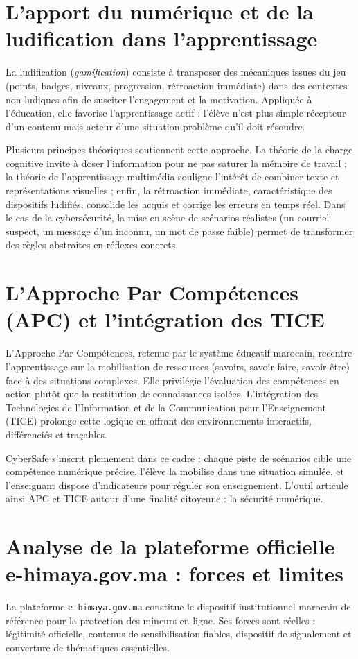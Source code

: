 \documentclass[12pt, a4paper, oneside]{report}
\begin{document}
\section{L'apport du numérique et de la ludification dans l'apprentissage}
La ludification (\textit{gamification}) consiste à transposer des mécaniques issues du jeu (points, badges, niveaux, progression, rétroaction immédiate) dans des contextes non ludiques afin de susciter l'engagement et la motivation. Appliquée à l'éducation, elle favorise l'apprentissage actif : l'élève n'est plus simple récepteur d'un contenu mais acteur d'une situation-problème qu'il doit résoudre.

Plusieurs principes théoriques soutiennent cette approche. La théorie de la charge cognitive invite à doser l'information pour ne pas saturer la mémoire de travail ; la théorie de l'apprentissage multimédia souligne l'intérêt de combiner texte et représentations visuelles ; enfin, la rétroaction immédiate, caractéristique des dispositifs ludifiés, consolide les acquis et corrige les erreurs en temps réel. Dans le cas de la cybersécurité, la mise en scène de scénarios réalistes (un courriel suspect, un message d'un inconnu, un mot de passe faible) permet de transformer des règles abstraites en réflexes concrets.

\section{L'Approche Par Compétences (APC) et l'intégration des TICE}
L'Approche Par Compétences, retenue par le système éducatif marocain, recentre l'apprentissage sur la mobilisation de ressources (savoirs, savoir-faire, savoir-être) face à des situations complexes. Elle privilégie l'évaluation des compétences en action plutôt que la restitution de connaissances isolées. L'intégration des Technologies de l'Information et de la Communication pour l'Enseignement (TICE) prolonge cette logique en offrant des environnements interactifs, différenciés et traçables.

CyberSafe s'inscrit pleinement dans ce cadre : chaque piste de scénarios cible une compétence numérique précise, l'élève la mobilise dans une situation simulée, et l'enseignant dispose d'indicateurs pour réguler son enseignement. L'outil articule ainsi APC et TICE autour d'une finalité citoyenne : la sécurité numérique.

\section{Analyse de la plateforme officielle e-himaya.gov.ma : forces et limites}
La plateforme \texttt{e-himaya.gov.ma} constitue le dispositif institutionnel marocain de référence pour la protection des mineurs en ligne. Ses forces sont réelles : légitimité officielle, contenus de sensibilisation fiables, dispositif de signalement et couverture de thématiques essentielles.
\end{document}
